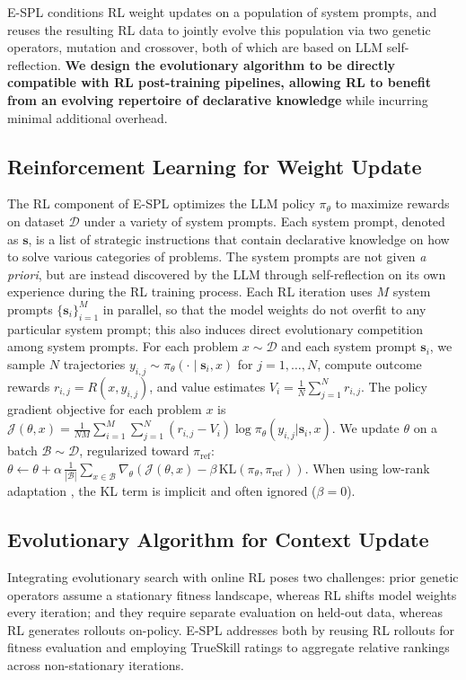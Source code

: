 \documentclass{article}
\theoremstyle{plain}
\theoremstyle{definition}
\theoremstyle{remark}
\begin{document}
E-SPL conditions RL weight updates on a population of system prompts, and reuses the resulting RL data to jointly evolve this population via two genetic operators, mutation and crossover, both of which are based on LLM self-reflection.
\textbf{We design the evolutionary algorithm to be directly compatible with RL post-training pipelines, allowing RL to benefit from an evolving repertoire of declarative knowledge} while incurring minimal additional overhead.

\vspace{-5pt}
\subsection{Reinforcement Learning for Weight Update}
The RL component of E-SPL optimizes the LLM policy $\pi_{\theta}$ to maximize rewards on dataset $\mathcal{D}$ under a variety of system prompts. Each system prompt, denoted as $\mathbf{s}$, is a list of strategic instructions that contain declarative knowledge on how to solve various categories of problems. The system prompts are not given \textit{a priori}, but are instead discovered by the LLM through self-reflection on its own experience during the RL training process. Each RL iteration uses $M$ system prompts $\{\mathbf{s}_{i}\}_{i=1}^{M}$ in parallel, so that the model weights do not overfit to any particular system prompt; this also induces direct evolutionary competition among system prompts.
For each problem $x\sim \mathcal{D}$ and each system prompt $\mathbf{s}_{i}$, we sample $N$ trajectories $y_{i,j}\sim \pi_{\theta}(\cdot \mid \mathbf{s}_{i}, x)$ for $j=1,\dots,N$, compute outcome rewards $r_{i,j} = R(x,y_{i,j})$, and value estimates $V_{i} = \frac{1}{N} \sum_{j=1}^{N} r_{i,j}$\label{eq:value-function-def}.
The policy gradient objective for each problem $x$ is $\mathcal{J}(\theta, x) = {\textstyle\frac{1}{NM}} {\textstyle\sum_{i=1}^{M}} {\textstyle\sum}_{j=1}^{N} ( r_{i,j} - V_{i} ) \log \pi_{\theta}( y_{i,j}| \mathbf{s}_{i}, x)$.
We update $\theta$ on a batch $\mathcal{B} \sim \mathcal{D}$, regularized toward $\pi_{\text{ref}}$: $\theta \leftarrow \theta + \alpha \, {\textstyle\frac{1}{ |\mathcal{B}| }} {\sum}_{x \in \mathcal{B}} \nabla_{\theta} (\mathcal{J}(\theta, x) - \beta \, \mathrm{KL}( \pi_{\theta}, \pi_{\text{ref}}))$.
When using low-rank adaptation \citep{lora}, the KL term is implicit and often ignored ($\beta=0$).

\vspace{-5pt}
\subsection{Evolutionary Algorithm for Context Update}
Integrating evolutionary search with online RL poses two challenges: prior genetic operators assume a stationary fitness landscape, whereas RL shifts model weights every iteration; and they require separate evaluation on held-out data, whereas RL generates rollouts on-policy. E-SPL addresses both by reusing RL rollouts for fitness evaluation and employing TrueSkill ratings to aggregate relative rankings across non-stationary iterations.
\end{document}
